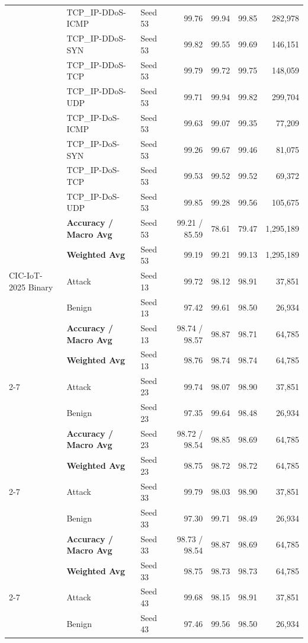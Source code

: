 \documentclass[a4paper,fleqn]{cas-sc}
\begin{document}
{\begin{landscape}
\begin{longtable}{lllrrrr}
 & TCP\_IP-DDoS-ICMP & Seed 53 & 99.76 & 99.94 & 99.85 & 282,978 \\
 & TCP\_IP-DDoS-SYN & Seed 53 & 99.82 & 99.55 & 99.69 & 146,151 \\
 & TCP\_IP-DDoS-TCP & Seed 53 & 99.79 & 99.72 & 99.75 & 148,059 \\
 & TCP\_IP-DDoS-UDP & Seed 53 & 99.71 & 99.94 & 99.82 & 299,704 \\
 & TCP\_IP-DoS-ICMP & Seed 53 & 99.63 & 99.07 & 99.35 & 77,209 \\
 & TCP\_IP-DoS-SYN & Seed 53 & 99.26 & 99.67 & 99.46 & 81,075 \\
 & TCP\_IP-DoS-TCP & Seed 53 & 99.53 & 99.52 & 99.52 & 69,372 \\
 & TCP\_IP-DoS-UDP & Seed 53 & 99.85 & 99.28 & 99.56 & 105,675 \\
 & \textbf{Accuracy / Macro Avg} & Seed 53 & 99.21 / 85.59 & 78.61 & 79.47 & 1,295,189 \\
 & \textbf{Weighted Avg} & Seed 53 & 99.19 & 99.21 & 99.13 & 1,295,189 \\
\midrule
CIC-IoT-2025 Binary & Attack & Seed 13 & 99.72 & 98.12 & 98.91 & 37,851 \\
 & Benign & Seed 13 & 97.42 & 99.61 & 98.50 & 26,934 \\
 & \textbf{Accuracy / Macro Avg} & Seed 13 & 98.74 / 98.57 & 98.87 & 98.71 & 64,785 \\
 & \textbf{Weighted Avg} & Seed 13 & 98.76 & 98.74 & 98.74 & 64,785 \\
\cline{2-7}
 & Attack & Seed 23 & 99.74 & 98.07 & 98.90 & 37,851 \\
 & Benign & Seed 23 & 97.35 & 99.64 & 98.48 & 26,934 \\
 & \textbf{Accuracy / Macro Avg} & Seed 23 & 98.72 / 98.54 & 98.85 & 98.69 & 64,785 \\
 & \textbf{Weighted Avg} & Seed 23 & 98.75 & 98.72 & 98.72 & 64,785 \\
\cline{2-7}
 & Attack & Seed 33 & 99.79 & 98.03 & 98.90 & 37,851 \\
 & Benign & Seed 33 & 97.30 & 99.71 & 98.49 & 26,934 \\
 & \textbf{Accuracy / Macro Avg} & Seed 33 & 98.73 / 98.54 & 98.87 & 98.69 & 64,785 \\
 & \textbf{Weighted Avg} & Seed 33 & 98.75 & 98.73 & 98.73 & 64,785 \\
\cline{2-7}
 & Attack & Seed 43 & 99.68 & 98.15 & 98.91 & 37,851 \\
 & Benign & Seed 43 & 97.46 & 99.56 & 98.50 & 26,934 \\

\end{longtable}
\end{landscape}}
\end{document}

